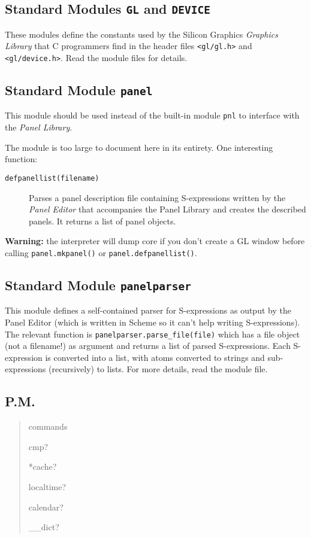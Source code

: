 \subsection{Standard Modules {\tt GL} and {\tt DEVICE}}

These modules define the constants used by the Silicon Graphics
{\em Graphics Library}
that C programmers find in the header files
{\tt <gl/gl.h>}
and
{\tt <gl/device.h>}.
Read the module files for details.

\subsection{Standard Module {\tt panel}}

This module should be used instead of the built-in module
{\tt pnl}
to interface with the
{\em Panel Library}.

The module is too large to document here in its entirety.
One interesting function:
\begin{description}
\item[{\tt defpanellist(filename)}]
Parses a panel description file containing S-expressions written by the
{\em Panel Editor}
that accompanies the Panel Library and creates the described panels.
It returns a list of panel objects.
\end{description}

{\bf Warning:}
the {\Python} interpreter will dump core if you don't create a GL window
before calling
{\tt panel.mkpanel()}
or
{\tt panel.defpanellist()}.

\subsection{Standard Module {\tt panelparser}}

This module defines a self-contained parser for S-expressions as output
by the Panel Editor (which is written in Scheme so it can't help writing
S-expressions).
The relevant function is
{\tt panelparser.parse\_file(file)}
which has a file object (not a filename!) as argument and returns a list
of parsed S-expressions.
Each S-expression is converted into a {\Python} list, with atoms converted
to {\Python} strings and sub-expressions (recursively) to {\Python} lists.
For more details, read the module file.

\subsection{P.M.}

\begin{verse}
commands

cmp?

*cache?

localtime?

calendar?

\_\_dict?
\end{verse}


